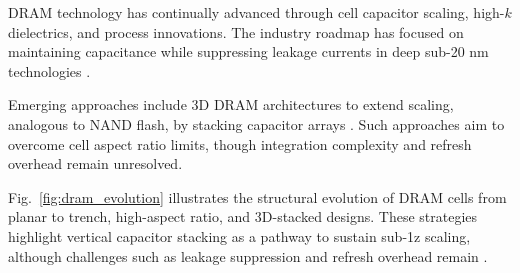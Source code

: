 DRAM technology has continually advanced through cell capacitor scaling, high-$k$ dielectrics, and process innovations. The industry roadmap has focused on maintaining capacitance while suppressing leakage currents in deep sub-20 nm technologies \cite{choi2022}. 

Emerging approaches include 3D DRAM architectures to extend scaling, analogous to NAND flash, by stacking capacitor arrays \cite{kim2021_dram,iedm2023_dram}. Such approaches aim to overcome cell aspect ratio limits, though integration complexity and refresh overhead remain unresolved. 

Fig.~\ref{fig:dram_evolution} illustrates the structural evolution of DRAM cells from planar to trench, high-aspect ratio, and 3D-stacked designs. These strategies highlight vertical capacitor stacking as a pathway to sustain sub-1z scaling, although challenges such as leakage suppression and refresh overhead remain \cite{iedm2023_dram}.
